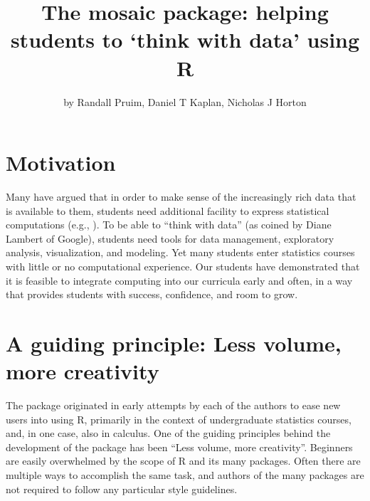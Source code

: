 \title{The mosaic package: helping students to `think with data' using R}
\author{by Randall Pruim, Daniel T Kaplan, Nicholas J Horton}

\maketitle


\section{Motivation}\label{motivation}

Many have argued that in order to make sense of the increasingly rich
data that is available to them, students need additional facility to
express statistical computations (e.g.,
\cite{NolanTempleLang:2010, Ridgway:2015, HortonBaumerWickham:2015}). To
be able to ``think with data'' (as coined by Diane Lambert of Google),
students need tools for data management, exploratory analysis,
visualization, and modeling. Yet many students enter statistics courses
with little or no computational experience. Our students have
demonstrated that it is feasible to integrate computing into our
curricula early and often, in a way that provides students with success,
confidence, and room to grow.

\section{A guiding principle: Less volume, more
creativity}\label{a-guiding-principle-less-volume-more-creativity}

The  \citep{mosaic} package originated in early attempts
by each of the authors to ease new users into using R, primarily in the
context of undergraduate statistics courses, and, in one case, also in
calculus. One of the guiding principles behind the development of the
 package has been ``Less volume, more creativity''.
Beginners are easily overwhelmed by the scope of R and its many
packages. Often there are multiple ways to accomplish the same task, and
authors of the many packages are not required to follow any particular
style guidelines.

